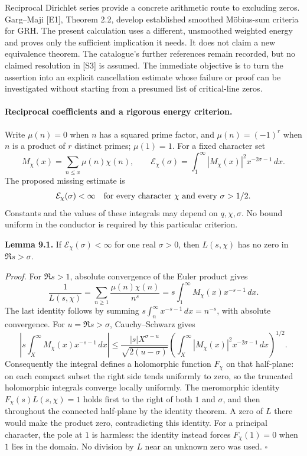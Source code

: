 \documentclass[11pt]{article}
\begin{document}
Reciprocal Dirichlet series provide a concrete arithmetic route to excluding
zeros. Garg--Maji [E1], Theorem 2.2, develop established smoothed
M\"obius-sum criteria for GRH. The present calculation uses a different,
unsmoothed weighted energy and proves only the sufficient implication it
needs. It does not claim a new equivalence theorem. The catalogue's further
references remain recorded, but no claimed resolution in [S3] is assumed.
The immediate objective is to turn the assertion into an explicit
cancellation estimate whose failure or proof can be investigated without
starting from a presumed list of critical-line zeros.

\paragraph{Reciprocal coefficients and a rigorous energy criterion.}
Write $\mu(n)=0$ when $n$ has a squared prime factor, and
$\mu(n)=(-1)^r$ when $n$ is a product of $r$ distinct primes; $\mu(1)=1$.
For a fixed character set
\[
 M_\chi(x)=\sum_{n\le x}\mu(n)\chi(n),\qquad
 \mathcal E_\chi(\sigma)=\int_1^\infty
       |M_\chi(x)|^2x^{-2\sigma-1}\,dx.
\]
The proposed missing estimate is
\begin{equation}\label{ra:9:energy}
 \mathcal E_\chi(\sigma)<\infty
 \quad\hbox{for every character $\chi$ and every $\sigma>1/2$.}
\end{equation}
Constants and the values of these integrals may depend on $q,\chi,\sigma$.
No bound uniform in the conductor is required by this particular criterion.

\textbf{Lemma 9.1.} If $\mathcal E_\chi(\sigma)<\infty$ for one real
$\sigma>0$, then $L(s,\chi)$ has no zero in $\Re s>\sigma$.

\textit{Proof.}
For $\Re s>1$, absolute convergence of the Euler product gives
\[
 \frac1{L(s,\chi)}=\sum_{n\ge1}\frac{\mu(n)\chi(n)}{n^s}
          =s\int_1^\infty M_\chi(x)x^{-s-1}\,dx.
\]
The last identity follows by summing
$s\int_n^\infty x^{-s-1}\,dx=n^{-s}$, with absolute convergence.
For $u=\Re s>\sigma$, Cauchy--Schwarz gives
\begin{equation}\label{ra:9:tail}
 \left|s\int_X^\infty M_\chi(x)x^{-s-1}\,dx\right|
 \le \frac{|s|X^{\sigma-u}}{\sqrt{2(u-\sigma)}}
 \left(\int_X^\infty |M_\chi(x)|^2x^{-2\sigma-1}\,dx\right)^{1/2}.
\end{equation}
Consequently the integral defines a holomorphic function $F_\chi$ on that
half-plane: on each compact subset the right side tends uniformly to zero,
so the truncated holomorphic integrals converge locally uniformly.
The meromorphic identity $F_\chi(s)L(s,\chi)=1$ holds first to the right
of both $1$ and $\sigma$, and then throughout the connected half-plane by
the identity theorem. A zero of $L$ there would make the product zero,
contradicting this identity. For a principal character, the pole at $1$
is harmless: the identity instead forces $F_\chi(1)=0$ when $1$ lies in
the domain. No division by $L$ near an unknown zero was used.
\hfill$\square$
\end{document}
